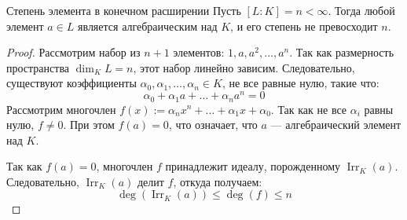 \begin{Proposition}{Степень элемента в конечном расширении}{}
	Пусть $[L:K] = n < \infty$. Тогда любой элемент $a \in L$ является алгебраическим над $K$, и его степень не превосходит $n$.
\end{Proposition}

\begin{proof}
	Рассмотрим набор из $n+1$ элементов: $1, a, a^2, \dots, a^n$.
	Так как размерность пространства $\dim_K L = n$, этот набор линейно зависим. Следовательно, существуют коэффициенты $\alpha_0, \alpha_1, \dots, \alpha_n \in K$, не все равные нулю, такие что:
	\[ \alpha_0 + \alpha_1 a + \dots + \alpha_n a^n = 0 \]
	Рассмотрим многочлен $f(x) := \alpha_n x^n + \dots + \alpha_1 x + \alpha_0$. Так как не все $\alpha_i$ равны нулю, $f \ne 0$. При этом $f(a) = 0$, что означает, что $a$ --- алгебраический элемент над $K$.

	Так как $f(a) = 0$, многочлен $f$ принадлежит идеалу, порожденному $\operatorname{Irr}_K(a)$.
	Следовательно, $\operatorname{Irr}_K(a)$ делит $f$, откуда получаем:
	\[ \deg(\operatorname{Irr}_K(a)) \le \deg(f) \le n \]
\end{proof}
